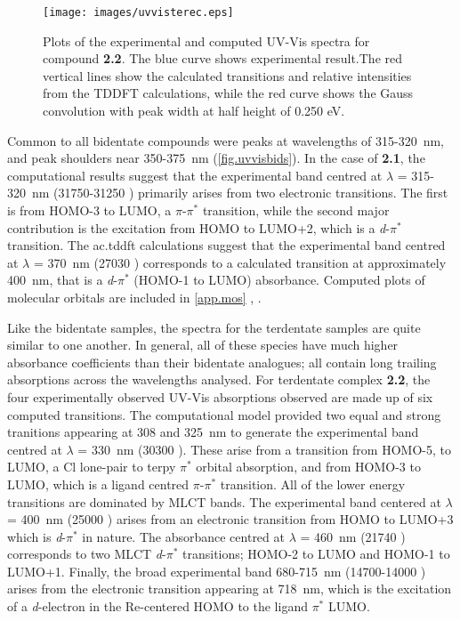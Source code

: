 \begin{figure}[!htb]
 \centering
  \texttt{[image: images/uvvisterec.eps]}
 \caption[Plots of the experimental and computed UV-Vis spectra for compound \textbf{2.2}]{Plots of the experimental and computed UV-Vis spectra for compound \textbf{2.2}.  The blue curve shows experimental result.The red vertical lines show the calculated transitions and relative intensities from the TDDFT calculations, while the red curve shows the Gauss convolution with peak width at half height of 0.250 eV.}
 \label{fig.uvvisterec}
\end{figure}

Common to all bidentate compounds were peaks at wavelengths of 315-320~nm, and peak shoulders near 350-375~nm (\autoref{fig.uvvisbids}). In the case of \textbf{2.1}, the computational results suggest that the experimental band centred at $\lambda$ = 315-320~nm (31750-31250 ) primarily arises from two electronic transitions. The first is from HOMO-3 to LUMO, a $\pi$-$\pi^\ast$ transition, while the second major contribution is the excitation from HOMO to LUMO+2, which is a \textit{d}-$\pi^\ast$ transition. The \gls{ac.tddft} calculations suggest that the experimental band centred at $\lambda$ = 370~nm (27030 ) corresponds to a calculated transition at approximately 400~nm, that is a \textit{d}-$\pi^\ast$ (HOMO-1 to LUMO) absorbance. Computed plots of molecular orbitals are included in \autoref{app.mos} , .

Like the bidentate samples, the spectra for the terdentate samples are quite similar to one another. In general, all of these species have much higher absorbance coefficients than their bidentate analogues; all contain long trailing absorptions across the wavelengths analysed. For terdentate complex \textbf{2.2}, the four experimentally observed UV-Vis absorptions observed are made up of six computed transitions. The computational model provided two equal and strong tranitions appearing at 308 and 325~nm to generate the experimental band centred at $\lambda$ = 330~nm (30300 ). These arise from a transition from HOMO-5, to LUMO, a Cl lone-pair to terpy $\pi^\ast$ orbital absorption, and from HOMO-3 to LUMO, which is a ligand centred $\pi$-$\pi^\ast$ transition. All of the lower energy transitions are dominated by MLCT bands. The experimental band centered at $\lambda$ = 400~nm (25000 ) arises from an electronic transition from HOMO to LUMO+3 which is \textit{d}-$\pi^\ast$ in nature. The absorbance centred at $\lambda$ = 460~nm (21740 ) corresponds to two MLCT \textit{d}-$\pi^\ast$ transitions; HOMO-2 to LUMO and HOMO-1 to LUMO+1. Finally, the broad experimental band 680-715~nm (14700-14000 ) arises from the electronic transition appearing at 718~nm, which is the excitation of a \textit{d}-electron in the Re-centered HOMO to the ligand $\pi^\ast$ LUMO.


